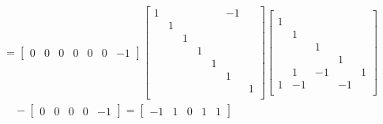\documentclass{ctexart}
\begin{document}
\begin{example} 
\begin{align*}
                       & = \begin{bmatrix}
                               0 & 0 & 0 & 0 & 0 & 0 & -1
                           \end{bmatrix} \begin{bmatrix}
                                             1 &   &   &   &   & -1 &   \\
                                               & 1 &   &   &   &    &   \\
                                               &   & 1 &   &   &    &   \\
                                               &   &   & 1 &   &    &   \\
                                               &   &   &   & 1 &    &   \\
                                               &   &   &   &   & 1  &   \\
                                               &   &   &   &   &    & 1 \\
                                         \end{bmatrix} \begin{bmatrix}
                                                             &    &    &    &   \\
                                                           1 &    &    &    &   \\
                                                             & 1  &    &    &   \\
                                                             &    & 1  &    &   \\
                                                             &    &    & 1  &   \\
                                                             & 1  & -1 &    & 1 \\
                                                           1 & -1 &    & -1 &   \\
                                                       \end{bmatrix} \\
                       & \quad - \begin{bmatrix}
                                     0 & 0 & 0 & 0 & -1
                                 \end{bmatrix} = \begin{bmatrix}
                                                     -1 & 1 & 0 & 1 & 1
                                                 \end{bmatrix}
    \end{align*}


\end{example}
\end{document}
